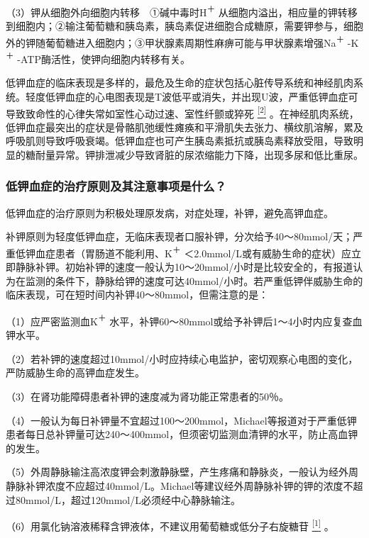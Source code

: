 （3）钾从细胞外向细胞内转移　①碱中毒时H\textsuperscript{＋}
从细胞内溢出，相应量的钾转移到细胞内；②输注葡萄糖和胰岛素，胰岛素促进细胞合成糖原，需要钾参与，细胞外的钾随葡萄糖进入细胞内；③甲状腺素周期性麻痹可能与甲状腺素增强Na\textsuperscript{＋}
-K\textsuperscript{＋} -ATP酶活性，使钾向细胞内转移有关。

低钾血症的临床表现是多样的，最危及生命的症状包括心脏传导系统和神经肌肉系统。轻度低钾血症的心电图表现是T波低平或消失，并出现U波，严重低钾血症可导致致命性的心律失常如室性心动过速、室性纤颤或猝死
\protect\hyperlink{text00025.htmlux5cux23ch2-24}{\textsuperscript{{[}2{]}}}
。在神经肌肉系统，低钾血症最突出的症状是骨骼肌弛缓性瘫痪和平滑肌失去张力、横纹肌溶解，累及呼吸肌则导致呼吸衰竭。低钾血症也可产生胰岛素抵抗或胰岛素释放受阻，导致明显的糖耐量异常。钾排泄减少导致肾脏的尿浓缩能力下降，出现多尿和低比重尿。

\subsubsection{低钾血症的治疗原则及其注意事项是什么？}

低钾血症的治疗原则为积极处理原发病，对症处理，补钾，避免高钾血症。

补钾原则为轻度低钾血症，无临床表现者口服补钾，分次给予40～80mmol/天；严重低钾血症患者（胃肠道不能利用、K\textsuperscript{＋}
＜2.0mmol/L或有威胁生命的症状）应立即静脉补钾。初始补钾的速度一般认为10～20mmol/小时是比较安全的，有报道认为在监测的条件下，静脉给钾的速度可达40mmol/小时。若严重低钾伴威胁生命的临床表现，可在短时间内补钾40～80mmol，但需注意的是：

（1）应严密监测血K\textsuperscript{＋}
水平，补钾60～80mmol或给予补钾后1～4小时内应复查血钾水平。

（2）若补钾的速度超过10mmol/小时应持续心电监护，密切观察心电图的变化，严防威胁生命的高钾血症发生。

（3）在肾功能障碍患者补钾的速度减为肾功能正常患者的50％。

（4）一般认为每日补钾量不宜超过100～200mmol，Michael等报道对于严重低钾患者每日总补钾量可达240～400mmol，但须密切监测血清钾的水平，防止高血钾的发生。

（5）外周静脉输注高浓度钾会刺激静脉壁，产生疼痛和静脉炎，一般认为经外周静脉补钾浓度不应超过40mmol/L。Michael等建议经外周静脉补钾的钾的浓度不超过80mmol/L，超过120mmol/L必须经中心静脉输注。

（6）用氯化钠溶液稀释含钾液体，不建议用葡萄糖或低分子右旋糖苷
\protect\hyperlink{text00025.htmlux5cux23ch1-24}{\textsuperscript{{[}1{]}}}
。

